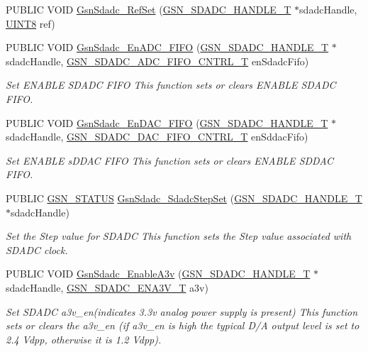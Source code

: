 \begin{DoxyCompactItemize}
PUBLIC VOID \hyperlink{a00583_a9918f67914c46f268d70e8e6cfce00be}{GsnSdadc\_\-RefSet} (\hyperlink{a00214}{GSN\_\-SDADC\_\-HANDLE\_\-T} $\ast$sdadcHandle, \hyperlink{a00660_gab27e9918b538ce9d8ca692479b375b6a}{UINT8} ref)
\item 
PUBLIC VOID \hyperlink{a00652_ga663bc61db73e496a016f93cc8c899668}{GsnSdadc\_\-EnADC\_\-FIFO} (\hyperlink{a00214}{GSN\_\-SDADC\_\-HANDLE\_\-T} $\ast$sdadcHandle, \hyperlink{a00652_gaf55aace91b55b8544afeb27482cc70d4}{GSN\_\-SDADC\_\-ADC\_\-FIFO\_\-CNTRL\_\-T} enSdadcFifo)
\begin{DoxyCompactList}\small\item\em Set ENABLE SDADC FIFO This function sets or clears ENABLE SDADC FIFO. \end{DoxyCompactList}\item 
PUBLIC VOID \hyperlink{a00652_ga06abdba260656ce57bd1e8871d9bc182}{GsnSdadc\_\-EnDAC\_\-FIFO} (\hyperlink{a00214}{GSN\_\-SDADC\_\-HANDLE\_\-T} $\ast$sdadcHandle, \hyperlink{a00652_ga1a95b10a6598d0019aec9049a8e37f19}{GSN\_\-SDADC\_\-DAC\_\-FIFO\_\-CNTRL\_\-T} enSddacFifo)
\begin{DoxyCompactList}\small\item\em Set ENABLE sDDAC FIFO This function sets or clears ENABLE SDDAC FIFO. \end{DoxyCompactList}\item 
PUBLIC \hyperlink{a00660_gada5951904ac6110b1fa95e51a9ddc217}{GSN\_\-STATUS} \hyperlink{a00652_gae0e0267e2151f315372e6160dbe65134}{GsnSdadc\_\-SdadcStepSet} (\hyperlink{a00214}{GSN\_\-SDADC\_\-HANDLE\_\-T} $\ast$sdadcHandle)
\begin{DoxyCompactList}\small\item\em Set the Step value for SDADC This function sets the Step value associated with SDADC clock. \end{DoxyCompactList}\item 
PUBLIC VOID \hyperlink{a00652_ga6636e214171d878bc65826cc1e251520}{GsnSdadc\_\-EnableA3v} (\hyperlink{a00214}{GSN\_\-SDADC\_\-HANDLE\_\-T} $\ast$sdadcHandle, \hyperlink{a00652_ga7c75febfa676ff7198e6665692e07c61}{GSN\_\-SDADC\_\-ENA3V\_\-T} a3v)
\begin{DoxyCompactList}\small\item\em Set SDADC a3v\_\-en(indicates 3.3v analog power supply is present) This function sets or clears the a3v\_\-en (if a3v\_\-en is high the typical D/A output level is set to 2.4 Vdpp, otherwise it is 1.2 Vdpp). \end{DoxyCompactList}\item 

\end{DoxyCompactItemize}

